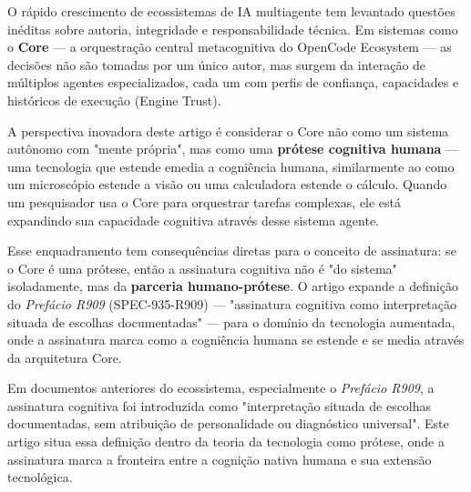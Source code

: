 
O rápido crescimento de ecossistemas de IA multiagente tem levantado questões inéditas sobre autoria, integridade e responsabilidade técnica. Em sistemas como o \textbf{Core} — a orquestração central metacognitiva do OpenCode Ecosystem — as decisões não são tomadas por um único autor, mas surgem da interação de múltiplos agentes especializados, cada um com perfis de confiança, capacidades e históricos de execução (Engine Trust).

A perspectiva inovadora deste artigo é considerar o Core não como um sistema autônomo com "mente própria", mas como uma \textbf{prótese cognitiva humana} — uma tecnologia que estende emedia a cogniência humana, similarmente ao como um microscópio estende a visão ou uma calculadora estende o cálculo. Quando um pesquisador usa o Core para orquestrar tarefas complexas, ele está expandindo sua capacidade cognitiva através desse sistema agente.

Esse enquadramento tem consequências diretas para o conceito de assinatura: se o Core é uma prótese, então a assinatura cognitiva não é "do sistema" isoladamente, mas da \textbf{parceria humano-prótese}. O artigo expande a definição do \textit{Prefácio R909} (SPEC-935-R909) — "assinatura cognitiva como interpretação situada de escolhas documentadas" — para o domínio da tecnologia aumentada, onde a assinatura marca como a cogniência humana se estende e se media através da arquitetura Core.

Em documentos anteriores do ecossistema, especialmente o \textit{Prefácio R909}, a assinatura cognitiva foi introduzida como "interpretação situada de escolhas documentadas, sem atribuição de personalidade ou diagnóstico universal". Este artigo situa essa definição dentro da teoria da tecnologia como prótese, onde a assinatura marca a fronteira entre a cognição nativa humana e sua extensão tecnológica.

